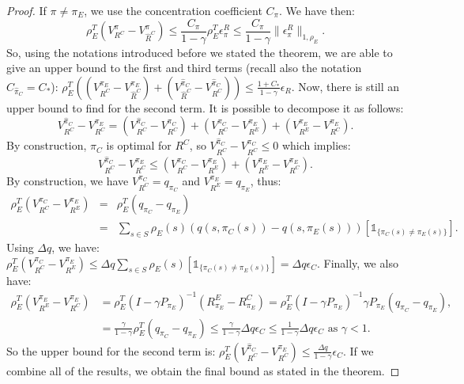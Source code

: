 \documentclass{llncs}
\begin{document}
\begin{proof}
If $\pi\neq\pi_E$, we use the concentration coefficient $C_\pi$. We have then:
\begin{equation}
  \rho_E^T(V^{\pi}_{R^C}-V^{\pi}_{\hat{R}^C})\leq\frac{C_\pi}{1-\gamma}\rho_E^T\epsilon^R_{\pi}\leq\frac{C_\pi}{1-\gamma}\|\epsilon^R_{\pi}\|_{1,\rho_E}.
  \end{equation}
So, using the notations introduced before we stated the theorem, we are able to give an upper bound to the first and third terms (recall also the notation $C_{\hat \pi_C} = C_*$):
$\rho_E^T((V^{\pi_E}_{R^C}-V^{\pi_E}_{\hat{R}^C})+(V^{\hat{\pi}_C}_{\hat{R}^C}-V^{\hat{\pi}_C}_{R^C}))\leq\frac{1+C_*}{1-\gamma}\epsilon_R$.
Now, there is still an upper bound to find for the second term. It is possible to decompose it as follows:
\begin{equation}
V^{\hat{\pi}_C}_{R^C}-V^{\pi_E}_{R^C}=(V^{\hat{\pi}_C}_{R^C}-V^{\pi_C}_{R^C})+(V^{\pi_C}_{R^C}-V^{\pi_E}_{R^E})+(V^{\pi_E}_{R^E}-V^{\pi_E}_{R^C}).
\end{equation}
By construction, $\pi_C$ is optimal for $R^C$, so $V^{\hat{\pi}_C}_{R^C}-V^{\pi_C}_{R^C}\leq0$ which implies:
\begin{equation}
V^{\hat{\pi}_C}_{R^C}-V^{\pi_E}_{R^C}\leq(V^{\pi_C}_{R^C}-V^{\pi_E}_{R^E})+(V^{\pi_E}_{R^E}-V^{\pi_E}_{R^C}).
\end{equation}
By construction, we have $V^{\pi_C}_{R^C}=q_{\pi_C}$ and $V^{\pi_E}_{R^E}=q_{\pi_E}$, thus:
\begin{eqnarray}
\rho_E^T(V^{\pi_C}_{R^C}-V^{\pi_E}_{R^E})&=&\rho_E^T(q_{\pi_C}-q_{\pi_E})\\
&=&\sum_{s\in S}\rho_E(s)(q(s,\pi_C(s))-q(s,\pi_E(s)))[\mathds{1}_{\{\pi_C(s)\neq\pi_E(s)\}}].
\end{eqnarray}
Using $\Delta q$, we have:
$\rho_E^T(V^{\pi_C}_{R^C}-V^{\pi_E}_{R^E})\leq\Delta q\sum_{s\in S}\rho_E(s)[\mathds{1}_{\{\pi_C(s)\neq\pi_E(s)\}}]= \Delta q \epsilon_C$.
Finally, we also have:
\begin{align}
\rho_E^T(V^{\pi_E}_{R^E}-V^{\pi_E}_{R^C})&=\rho_E^T(I-\gamma P_{\pi_E})^{-1}(R^E_{\pi_E}-R^C_{\pi_E})=\rho_E^T(I-\gamma P_{\pi_E})^{-1}\gamma P_{\pi_E}(q_{\pi_C}-q_{\pi_E}),
\\
&=\frac{\gamma}{1-\gamma}\rho_E^T(q_{\pi_C}-q_{\pi_E})\leq \frac{\gamma}{1-\gamma}\Delta q \epsilon_C \leq  \frac{1}{1-\gamma}\Delta q \epsilon_C\textrm{ as }\gamma<1.
\end{align}
So the upper bound for the second term is: $\rho_E^T(V^{\hat{\pi}_C}_{R^C}-V^{\pi_E}_{R^C})\leq \frac{\Delta q}{1-\gamma}\epsilon_C$.
If we combine all of the results, we obtain the final bound as stated in the theorem.
\end{proof}
\end{document}
